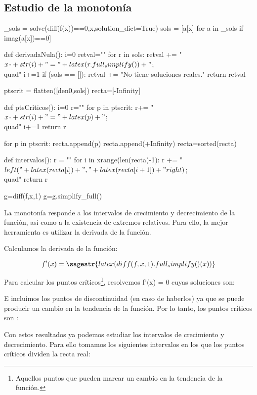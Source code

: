 \subsection{Estudio de la monotonía}

\begin{sagesilent}

_sols = solve(diff(f(x))==0,x,solution_dict=True)
sols = [a[x] for a in _sols if imag(a[x])==0]

def derivadaNula():
    i=0
    retval=""
    for r in sols:
        retval += "$x_"+str(i)+" = "+latex(r.full_simplify())+"$;\\quad"
        i+=1
    if (sols == []):
        retval += "No tiene soluciones reales."
    return retval

ptscrit = flatten([den0,sols])
recta=[-Infinity]

def ptsCriticos():
    i=0
    r=""
    for p in ptscrit:
        r+= "$x_"+str(i)+"="+latex(p)+"$;\\quad"
        i+=1
    return r

for p in ptscrit:
     recta.append(p)
recta.append(+Infinity)
recta=sorted(recta)

def intervalos():
    r = ""
    for i in xrange(len(recta)-1):
        r += "$\\left("+latex(recta[i])+","+latex(recta[i+1])+"\\right)$;\\quad"  
    return r

g=diff(f,x,1)
g=g.simplify_full()
\end{sagesilent}

La monotonía responde a los intervalos de crecimiento y decrecimiento de la función, así como a la existencia de extremos relativos.
%
Para ello, la mejor herramienta es utilizar la derivada de la función.

Calculamos la derivada de la función:

\[f'(x) = \sagestr{latex(diff(f,x,1).full_simplify()(x))} \]%

Para calcular los puntos críticos\footnote{Aquellos puntos que pueden marcar un cambio en la tendencia de la función.}, resolvemos f'(x) = 0 cuyas soluciones son: 

E incluimos los puntos de discontinuidad (en caso de haberlos) ya que se puede producir un cambio en la tendencia de la función. 
%
Por lo tanto, los puntos críticos son : 


Con estos resultados ya podemos estudiar los intervalos de crecimiento y decrecimiento. 
%
Para ello tomamos los siguientes intervalos en los que los puntos críticos dividen la recta real:

